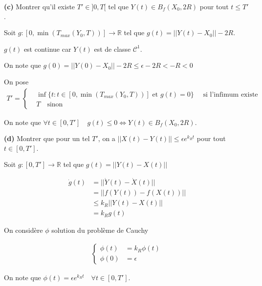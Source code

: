 \documentclass[french]{article}
\begin{document}
	\begin{tcolorbox}[colback=gray!5!white,colframe=gray!75!black]
		\textbf{\large{(c)}} Montrer qu'il existe $T' \in ]0, T[$ tel que $Y(t) \in B_f(X_0, 2R)$ pour tout $t \leq T'$.
	\end{tcolorbox}

	Soit $g: [0, \min(T_{max}(Y_0, T))] \to \mathbb{R}$ tel que  $g(t) = || Y(t) - X_0 || - 2R$.
	
	$g(t)$ est continue car $Y(t)$ est de classe $\mathcal{C}^1$.
	
	On note que $g(0) = ||Y(0) - X_0|| - 2R \leq \epsilon - 2R < -R < 0$
	
	On pose
	\begin{align}
	T' = 
		\begin{cases}
			&\inf \{ t : t \in [0, \min(T_{max}(Y_0, T))] \text{ et } g(t) = 0 \} \quad \text{ si l'infimum existe }\\
			&T \quad \text{sinon}
		\end{cases}
	\end{align}
	
	On note que $\forall t \in [0, T'] \quad g(t) \leq 0 \iff Y(t) \in B_f(X_0, 2R)$.
	
	\begin{tcolorbox}[colback=gray!5!white,colframe=gray!75!black]
		\textbf{\large{(d)}} Montrer que pour un tel $T'$, on a $|| X(t) - Y(t) || \leq \epsilon e^{k_Rt}$ pour tout $t \in [0, T']$.
	\end{tcolorbox}

	Soit $g : [0, T'] \to \mathbb{R}$ tel que $g(t) = || Y(t) - X(t) ||$

	\begin{align}
		\dot{g}(t) &= || \dot{Y}(t) - \dot{X}(t) ||\\
						 &= || f(Y(t)) - f(X(t)) ||\\
						 &\leq k_R || Y(t) - X(t) ||\\
						 &= k_Rg(t)
	\end{align}
	
	On considère $\phi$ solution du problème de Cauchy
	
	\begin{align}
		\begin{cases}
		\phi(t) &= k_R\phi(t)\\
		\phi(0) &= \epsilon
		\end{cases}
	\end{align}
	
	On note que $\phi(t) = \epsilon e^{k_Rt} \quad \forall t \in [0, T']$.
	
\end{document}
